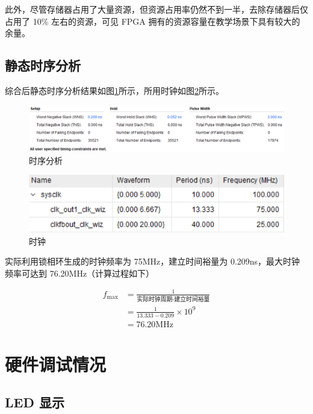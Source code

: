 \documentclass[a4paper]{article}  %
\begin{document}
此外，尽管存储器占用了大量资源，但资源占用率仍然不到一半，去除存储器后仅占用了 10\% 左右的资源，可见 FPGA 拥有的资源容量在教学场景下具有较大的余量。

\subsection{静态时序分析}

综合后静态时序分析结果如图\ref{fig:time_summary}所示，所用时钟如图\ref{fig:clock_summary}所示。

\begin{figure}[ht]
    \centering
    \includegraphics[width=.9\textwidth]{asserts/time_summary.png}
    \caption{
        时序分析
    }\label{fig:time_summary}
\end{figure}

\begin{figure}[ht]
    \centering
    \includegraphics[width=.6\textwidth]{asserts/clock_summary.png}
    \caption{
        时钟
    }\label{fig:clock_summary}
\end{figure}

实际利用锁相环生成的时钟频率为 75MHz，建立时间裕量为 0.209ns，最大时钟频率可达到 76.20MHz（计算过程如下）

\begin{align}
    f_{\text{max}} &= \frac{1}{\text{实际时钟周期-建立时间裕量}} \\
    &= \frac{1}{13.333-0.209}\times 10^9 \\
    &= 76.20 \text{MHz}
\end{align}

\section{硬件调试情况}

\subsection{LED 显示}
\end{document}
